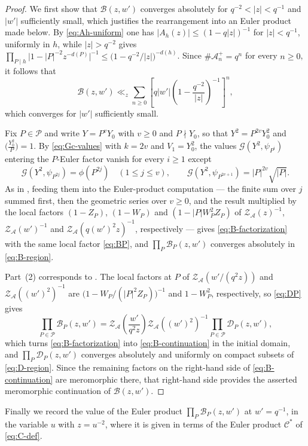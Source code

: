 \documentclass[a4paper,reqno]{amsart}
\numberwithin{equation}{section}
\theoremstyle{remark}
\theoremstyle{definition}
\newcommand{\A}{\mathcal{A}}
\newcommand{\Gc}{\mathcal{G}}
\begin{document}
\begin{proof}
We first show that $\mathcal B(z,w')$ converges
absolutely for $q^{-2}<|z|<q^{-1}$ and $|w'|$ sufficiently small, which
justifies the rearrangement into an Euler product made below. By
\eqref{eq:Ah-uniform} one has $|A_h(z)|\le(1-q|z|)^{-1}$ for $|z|<q^{-1}$,
uniformly in $h$, while $|z|>q^{-2}$ gives
$\prod_{P\mid h}\bigl|1-|P|^{-2}z^{-d(P)}\bigr|^{-1}
\le\bigl(1-q^{-2}/|z|\bigr)^{-d(h)}$. Since $\#\A_n^+=q^n$ for every
$n\ge0$, it follows that
$$
\mathcal B(z,w')\ll_z\sum_{n\ge0}
\left[q|w'|\left(1-\frac{q^{-2}}{|z|}\right)^{-1}\right]^n,
$$
which converges for $|w'|$ sufficiently small.

Fix $P\in\mathcal P$ and write $Y=P^vY_0$ with $v\ge0$ and $P\nmid Y_0$, so
that $Y^2=P^{2v}Y_0^2$ and $\bigl(\frac{Y_0^2}{P}\bigr)=1$. By
\eqref{eq:Gc-values} with $k=2v$ and $V_1=Y_0^2$, the values
$\Gc(Y^2,\psi_{P^i})$ entering the $P$-Euler factor vanish for every
$i\ge1$ except
$$
\Gc(Y^2,\psi_{P^{2j}})=\phi(P^{2j})
\quad(1\le j\le v),
\qquad
\Gc(Y^2,\psi_{P^{2v+1}})=|P|^{2v}\sqrt{|P|}.
$$
As in \cite[Lemma~6.2]{Fl17-1}, feeding them into the Euler-product
computation --- the finite sum over $j$ summed first, then the geometric
series over $v\ge0$, and the result multiplied by the local factors
$(1-Z_P)$, $(1-W_P)$ and $(1-|P|W_P^2Z_P)$ of $\mathcal Z_{\A}(z)^{-1}$,
$\mathcal Z_{\A}(w')^{-1}$ and $\mathcal Z_{\A}(q(w')^2z)^{-1}$,
respectively --- gives \eqref{eq:B-factorization} with the same local factor
\eqref{eq:BP}, and $\prod_{P}\mathcal B_P(z,w')$ converges absolutely in
\eqref{eq:B-region}.

Part~(2) corresponds to \cite[Lemma~6.3]{Fl17-1}. The local
factors at $P$ of $\mathcal Z_{\A}(w'/(q^2z))$ and
$\mathcal Z_{\A}((w')^2)^{-1}$ are
$\bigl(1-W_P/(|P|^2Z_P)\bigr)^{-1}$ and $1-W_P^2$, respectively, so
\eqref{eq:DP} gives
$$
\prod_{P\in\mathcal P}\mathcal B_P(z,w')
=
\mathcal Z_{\A}\!\left(\frac{w'}{q^2z}\right)
\mathcal Z_{\A}((w')^2)^{-1}
\prod_{P\in\mathcal P}\mathcal D_P(z,w'),
$$
which turns \eqref{eq:B-factorization} into \eqref{eq:B-continuation} in the
initial domain, and $\prod_{P}\mathcal D_P(z,w')$ converges absolutely and
uniformly on compact subsets of \eqref{eq:D-region}. Since the remaining
factors on the right-hand side of \eqref{eq:B-continuation} are meromorphic there, that
right-hand side provides the asserted meromorphic continuation of
$\mathcal B(z,w')$.
\end{proof}

Finally we record the value of the Euler product
$\prod_{P}\mathcal B_P(z,w')$ at $w'=q^{-1}$, in the variable $u$ with
$z=u^{-2}$, where it is given in terms of the Euler product
$\mathcal C^*$ of \eqref{eq:C-def}.
\end{document}
